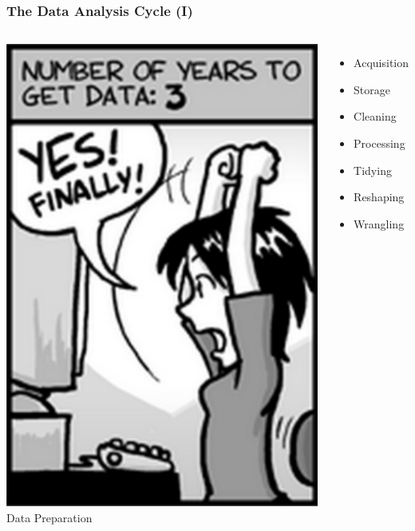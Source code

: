 \documentclass{beamer}
\begin{document}
\begin{frame}
\frametitle{The Data Analysis Cycle (I)}
\begin{columns}
    \hspace*{1cm}
    \includegraphics[scale=0.4]{./figures/im1.png}
    Data Preparation  
    \begin{itemize}
    \item[] Acquisition
    \item[] Storage
    \item[] Cleaning
    \item[] Processing
    \item[] Tidying
    \item[] Reshaping
    \item[] Wrangling
    \end{itemize}
\end{columns}
\end{frame}
\end{document}
